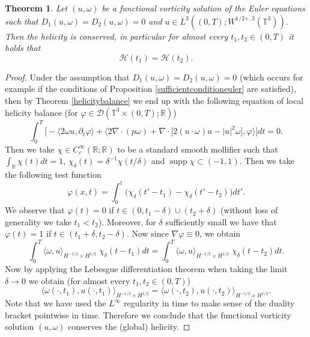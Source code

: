 \documentclass[12pt,a4paper]{article}
\DeclareMathOperator{\supp}{supp}
\newtheorem{theorem}{Theorem}[section]
\theoremstyle{definition}
\theoremstyle{remark}
\numberwithin{equation}{section}
\begin{document}
\begin{theorem} \label{conservationeuler}
Let $(u, \omega)$ be a functional vorticity solution of the Euler equations such that $D_1 (u, \omega) = D_2 (u, \omega) = 0$ and $u \in L^3 ((0,T); W^{1/2+,3} (\mathbb{T}^3))$. Then the helicity is conserved, in particular for almost every $t_1, t_2 \in (0,T)$ it holds that
\begin{equation}
\mathcal{H} (t_1) = \mathcal{H} (t_2).
\end{equation}
\end{theorem}
\begin{proof}
Under the assumption that $D_1 (u, \omega) = D_2 (u, \omega) = 0$ (which occurs for example if the conditions of Proposition \ref{sufficientconditioneuler} are satisfied), then by Theorem \ref{helicitybalance} we end up with the following equation of local helicity balance (for $\varphi \in \mathcal{D} (\mathbb{T}^3 \times (0,T); \mathbb{R})$)
\begin{equation*}
\int_0^T \bigg[ - \bigg\langle 2 \omega u, \partial_t \varphi \bigg\rangle + \bigg\langle  2 \nabla \cdot (p \omega) + \nabla \cdot \big[ 2 (u \cdot \omega) u - \lvert u \rvert^2 \omega \big] , \varphi \bigg\rangle \bigg] dt = 0.
\end{equation*}
Then we take $\chi \in C_c^\infty (\mathbb{R}; \mathbb{R})$ to be a standard smooth mollifier such that $\int_{\mathbb{R}} \chi (t) dt = 1$, $\chi_\delta (t) = \delta^{-1} \chi (t/\delta)$ and $\supp \chi \subset (-1,1)$. Then we take the following test function
\begin{equation*}
\varphi (x,t) = \int_0^t \big( \chi_\delta (t' - t_1) - \chi_\delta (t' - t_2) \big) dt'.
\end{equation*}
We observe that $\varphi (t) = 0$ if $t \in (0,t_1 - \delta) \cup (t_2 + \delta)$ (without loss of generality we take $t_1 < t_2$). Moreover, for $\delta$ sufficiently small we have that $\varphi (t) = 1$ if $t \in (t_1 + \delta, t_2 - \delta)$. Now since $\nabla \varphi \equiv 0$, we obtain
\begin{equation*}
\int_0^T \langle \omega, u \rangle_{H^{-1/2} \times H^{1/2}} \; \chi_\delta (t - t_1) dt = \int_0^T \langle \omega, u \rangle_{H^{-1/2} \times H^{1/2}} \; \chi_\delta (t - t_2) dt.
\end{equation*}
Now by applying the Lebesgue differentiation theorem when taking the limit $\delta \rightarrow 0$ we obtain (for almost every $t_1, t_2 \in (0,T)$)
\begin{equation}
\langle \omega (\cdot, t_1) , u (\cdot, t_1) \rangle_{H^{-1/2} \times H^{1/2}} = \langle \omega (\cdot, t_2), u (\cdot, t_2) \rangle_{H^{-1/2} \times H^{1/2}}.
\end{equation}
Note that we have used the $L^\infty$ regularity in time to make sense of the duality bracket pointwise in time. Therefore we conclude that the functional vorticity solution $(u,\omega)$ conserves the (global) helicity.
\end{proof}
\end{document}
